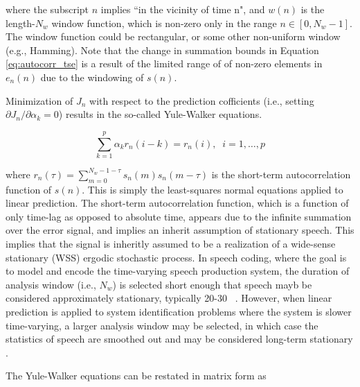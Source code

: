 \noindent
where the subscript $n$ implies ``in the vicinity of time n", and $w(n)$ is the length-$N_w$ window function, which is non-zero only in the range $n \in [0, N_w-1]$. The window function could be rectangular, or some other non-uniform window (e.g., Hamming). Note that the change in summation bounds in Equation \ref{eq:autocorr_tse} is a result of the limited range of of non-zero elements in $e_n(n)$ due to the windowing of $s(n)$.

Minimization of $J_n$ with respect to the prediction cofficients (i.e., setting $\partial J_n  /\partial \alpha_k=0$) results in the so-called Yule-Walker equations. 

\begin{equation}
	\sum_{k=1}^{p} \alpha_k r_n(i-k) = r_n(i), \;\; i=1,\dots,p
\end{equation}

\noindent
where $r_n(\tau) = \sum_{m=0}^{N_w-1-\tau}s_n(m)s_n(m-\tau)$ is the short-term autocorrelation function of $s(n)$. This is simply the least-squares normal equations applied to linear prediction. The short-term autocorrelation function, which is a function of only time-lag as opposed to absolute time, appears due to the infinite summation over the error signal, and implies an inherit assumption of stationary speech. This implies that the signal is inheritly assumed to be a realization of a wide-sense stationary (WSS) ergodic stochastic process. In speech coding, where the goal is to model and encode the time-varying speech production system, the duration of analysis window (i.e., $N_w$) is selected short enough that speech mayb be considered approximately stationary, typically 20-30 \unit{\milli\sec}. However, when linear prediction is applied to system identification problems where the system is slower time-varying, a larger analysis window may be selected, in which case the statistics of speech are smoothed out and may be considered long-term stationary \citep{gazor2003speech}.

The Yule-Walker equations can be restated in matrix form as

